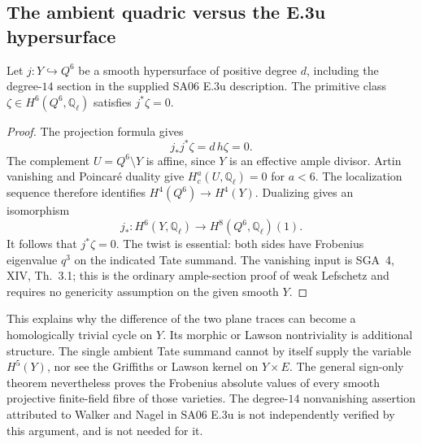 \subsection{The ambient quadric versus the E.3u hypersurface}

\begin{proposition}
Let $j:Y\hookrightarrow Q^6$ be a smooth hypersurface of positive degree $d$, including the degree-$14$ section in the supplied SA06 E.3u description. The primitive class $\zeta\in H^6(Q^6,\mathbb Q_\ell)$ satisfies $j^*\zeta=0$.
\end{proposition}

\begin{proof}
The projection formula gives
\[
 j_*j^*\zeta=d\,h\zeta=0.
\]
The complement $U=Q^6\setminus Y$ is affine, since $Y$ is an effective ample divisor. Artin vanishing and Poincar\'e duality give $H_c^a(U,\mathbb Q_\ell)=0$ for $a<6$. The localization sequence therefore identifies $H^4(Q^6)\to H^4(Y)$. Dualizing gives an isomorphism
\[
 j_*:H^6(Y,\mathbb Q_\ell)
 \longrightarrow H^8(Q^6,\mathbb Q_\ell)(1).
\]
It follows that $j^*\zeta=0$. The twist is essential: both sides have Frobenius eigenvalue $q^3$ on the indicated Tate summand. The vanishing input is SGA~4, XIV, Th.~3.1; this is the ordinary ample-section proof of weak Lefschetz and requires no genericity assumption on the given smooth $Y$.
\end{proof}

This explains why the difference of the two plane traces can become a homologically trivial cycle on $Y$. Its morphic or Lawson nontriviality is additional structure. The single ambient Tate summand cannot by itself supply the variable $H^5(Y)$, nor see the Griffiths or Lawson kernel on $Y\times E$. The general sign-only theorem nevertheless proves the Frobenius absolute values of every smooth projective finite-field fibre of those varieties. The degree-$14$ nonvanishing assertion attributed to Walker and Nagel in SA06 E.3u is not independently verified by this argument, and is not needed for it.
